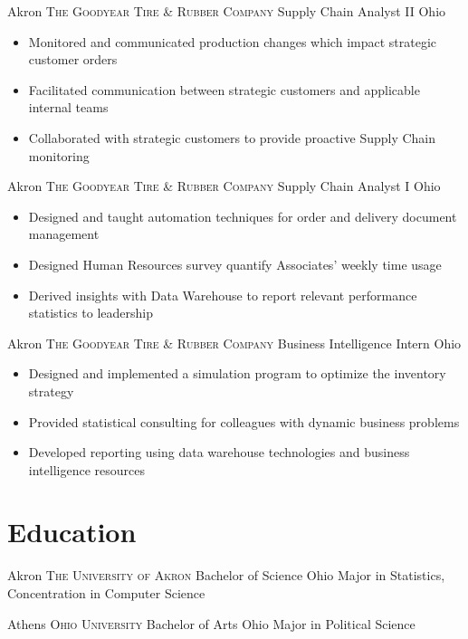 \documentclass[letterpaper,12pt,color,final]{moderncv}
\begin{document}
\newpage

{Akron}
{\textsc{The Goodyear Tire \& Rubber Company}}
{Supply Chain Analyst II}
{Ohio}
{\begin{itemize}
  \item Monitored and communicated production changes which impact strategic customer orders
  \item Facilitated communication between strategic customers and applicable internal teams
  \item Collaborated with strategic customers to provide proactive Supply Chain monitoring
 \end{itemize}}

{Akron}
{\textsc{The Goodyear Tire \& Rubber Company}}
{Supply Chain Analyst I}
{Ohio}
{\begin{itemize}
  \item Designed and taught automation techniques for order and delivery document management
  \item Designed Human Resources survey quantify Associates' weekly time usage
  \item Derived insights with Data Warehouse to report relevant performance statistics to leadership
 \end{itemize}}

{Akron}
{\textsc{The Goodyear Tire \& Rubber Company}}
{Business Intelligence Intern}
{Ohio}
{\begin{itemize}
  \item Designed and implemented a simulation program to optimize the inventory strategy
  \item Provided statistical consulting for colleagues with dynamic business problems
  \item Developed reporting using data warehouse technologies and business intelligence resources
 \end{itemize}}

\section{Education}

{Akron}
{\textsc{The University of Akron}}
{Bachelor of Science}
{Ohio}
{Major in Statistics, Concentration in Computer Science}

{Athens}
{\textsc{Ohio University}}
{Bachelor of Arts}
{Ohio}
{Major in Political Science}
\end{document}
